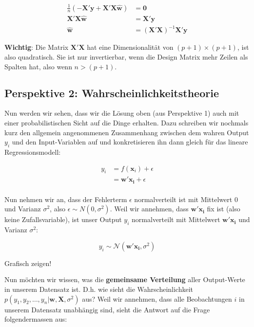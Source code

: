 \documentclass[
]{book}
\begin{document}
\begin{align}
\frac{1}{n} (-\mathbf{X}'\mathbf{y} + \mathbf{X}'\mathbf{X}\mathbf{\hat{w}}) &= \mathbf{0} \\
\mathbf{X}'\mathbf{X}\mathbf{\hat{w}} &= \mathbf{X}'\mathbf{y} \\
\mathbf{\hat{w}} &= (\mathbf{X}'\mathbf{X})^{-1}\mathbf{X}'\mathbf{y}
\end{align}

\textbf{Wichtig}: Die Matrix \(\mathbf{X}'\mathbf{X}\) hat eine Dimensionalität von \((p+1) \times (p+1)\), ist also quadratisch. Sie ist nur invertierbar, wenn die Design Matrix mehr Zeilen als Spalten hat, also wenn \(n > (p+1)\).

\hypertarget{perspektive-2-wahrscheinlichkeitstheorie}{%
\subsection{Perspektive 2: Wahrscheinlichkeitstheorie}\label{perspektive-2-wahrscheinlichkeitstheorie}}

Nun werden wir sehen, dass wir die Lösung oben (aus Perspektive 1) auch mit einer probabilistischen Sicht auf die Dinge erhalten. Dazu schreiben wir nochmals kurz den allgemein angenommenen Zusammenhang zwischen dem wahren Output \(y_i\) und den Input-Variablen auf und konkretisieren ihn dann gleich für das lineare Regressionsmodell:

\begin{align}
y_i &= f(\mathbf{x}_i) + \epsilon \\
&= \mathbf{w}' \mathbf{x_i} + \epsilon \\
\end{align}

Nun nehmen wir an, dass der Fehlerterm \(\epsilon\) normalverteilt ist mit Mittelwert 0 und Varianz \(\sigma^2\), also \(\epsilon \sim N(0,\sigma^2)\). Weil wir annehmen, dass \(\mathbf{w}' \mathbf{x_i}\) fix ist (also keine Zufallsvariable), ist unser Output \(y_i\) normalverteilt mit Mittelwert \(\mathbf{w}' \mathbf{x_i}\) und Varianz \(\sigma^2\):

\[
y_i \sim \mathcal{N}\left(\mathbf{w}' \mathbf{x_i}, \sigma^2\right)
\]

Grafisch zeigen!

Nun möchten wir wissen, was die \textbf{gemeinsame Verteilung} aller Output-Werte in unserem Datensatz ist. D.h. wie sieht die Wahrscheinlichkeit \(p(y_1,y_2,\dots,y_n|\mathbf{w},\mathbf{X},\sigma^2)\) aus? Weil wir annehmen, dass alle Beobachtungen \(i\) in unserem Datensatz unabhängig sind, sieht die Antwort auf die Frage folgendermassen aus:
\end{document}
